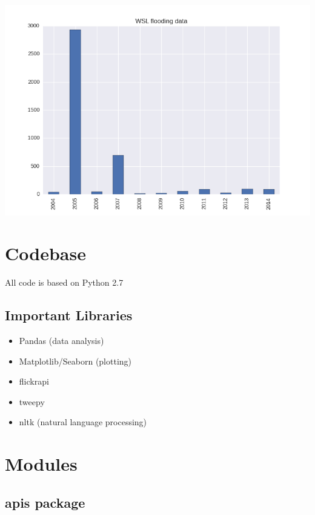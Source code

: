 \documentclass[letterpaper,10pt,english]{sphinxmanual}
\begin{document}
\includegraphics{wsl.png}


\chapter{Codebase}
\label{codebase:codebase}\label{codebase::doc}
All code is based on Python 2.7


\section{Important Libraries}
\label{codebase:important-libraries}\begin{itemize}
\item {} 
Pandas (data analysis)

\item {} 
Matplotlib/Seaborn (plotting)

\item {} 
flickrapi

\item {} 
tweepy

\item {} 
nltk (natural language processing)

\end{itemize}


\chapter{Modules}
\label{modules:modules}\label{modules::doc}

\section{apis package}
\label{apis:apis-package}\label{apis::doc}
\end{document}
